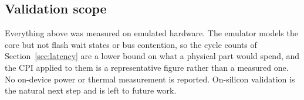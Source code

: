 \subsection{Validation scope}
\label{sec:deploy_limits}

Everything above was measured on emulated hardware. The emulator models the
core but not flash wait states or bus contention, so the cycle counts of
Section~\ref{sec:latency} are a lower bound on what a physical part would
spend, and the CPI applied to them is a representative figure rather than a
measured one. No on-device power or thermal measurement is reported.
On-silicon validation is the natural next step and is left to future work.
